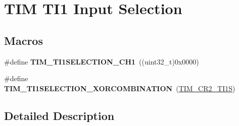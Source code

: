 \hypertarget{group___t_i_m___t_i1___selection}{\section{T\-I\-M T\-I1 Input Selection}
\label{group___t_i_m___t_i1___selection}
}
\subsection*{Macros}
\begin{DoxyCompactItemize}
\item 
\hypertarget{group___t_i_m___t_i1___selection_gace6563bccf7635461f660fbed6241488}{\#define {\bfseries T\-I\-M\-\_\-\-T\-I1\-S\-E\-L\-E\-C\-T\-I\-O\-N\-\_\-\-C\-H1}~((uint32\-\_\-t)0x0000)}\label{group___t_i_m___t_i1___selection_gace6563bccf7635461f660fbed6241488}

\item 
\hypertarget{group___t_i_m___t_i1___selection_ga40dfcb0e3f2fdf0f45cbba227106310a}{\#define {\bfseries T\-I\-M\-\_\-\-T\-I1\-S\-E\-L\-E\-C\-T\-I\-O\-N\-\_\-\-X\-O\-R\-C\-O\-M\-B\-I\-N\-A\-T\-I\-O\-N}~(\hyperlink{group___peripheral___registers___bits___definition_gad07504497b70af628fa1aee8fe7ef63c}{T\-I\-M\-\_\-\-C\-R2\-\_\-\-T\-I1\-S})}\label{group___t_i_m___t_i1___selection_ga40dfcb0e3f2fdf0f45cbba227106310a}

\end{DoxyCompactItemize}


\subsection{Detailed Description}
